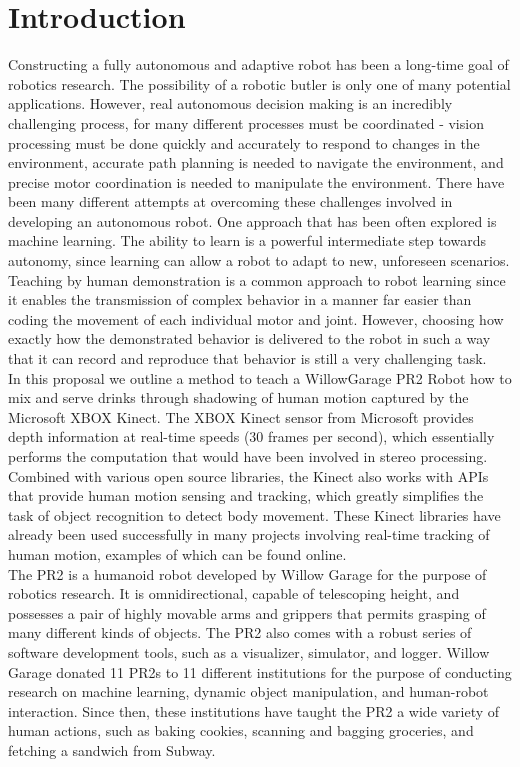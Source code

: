 \documentclass{sig-alternate}
\begin{document}
\section{Introduction}
\label{sec:intro}
Constructing a fully autonomous and adaptive robot has been a long-time goal of robotics research. The possibility of a robotic butler is only one of many potential applications. However, real autonomous decision making is an incredibly challenging process, for many different processes must be coordinated - vision processing must be done quickly and accurately to respond to changes in the environment, accurate path planning is needed to navigate the environment, and precise motor coordination is needed to manipulate the environment. There have been many different attempts at overcoming these challenges involved in developing an autonomous robot. One approach that has been often explored is machine learning. The ability to learn is a powerful intermediate step towards autonomy, since learning can allow a robot to adapt to new, unforeseen scenarios. Teaching by human demonstration is a common approach to robot learning since it enables the transmission of complex behavior in a manner far easier than coding the movement of each individual motor and joint. However, choosing how exactly how the demonstrated behavior is delivered to the robot in such a way that it can record and reproduce that behavior is still a very challenging task.\\ 
In this proposal we outline a method to teach a WillowGarage PR2 Robot how to mix and serve drinks through shadowing of human motion captured by the Microsoft XBOX Kinect. The XBOX Kinect sensor from Microsoft provides depth information at real-time speeds (30 frames per second), which essentially performs the computation that would have been involved in stereo processing. Combined with various open source libraries\cite{kinect}, the Kinect also works with APIs that provide human motion sensing and tracking, which greatly simplifies the task of object recognition to detect body movement. These Kinect libraries have already been used successfully in many projects involving real-time tracking of human motion, examples of which can be found online\cite{freenect}.\\
The PR2 is a humanoid robot developed by  Willow Garage\cite{pr2} for the purpose of robotics research. It is omnidirectional, capable of telescoping height, and possesses a pair of highly movable arms and grippers that permits grasping of many different kinds of objects. The PR2 also comes with a robust series of software development tools, such as a visualizer, simulator, and logger. Willow Garage donated 11 PR2s to 11 different institutions for the purpose of conducting research on machine learning, dynamic object manipulation, and human-robot interaction\cite{ros_pr2}. Since then, these institutions have taught the PR2 a wide variety of human actions, such as baking cookies\cite{cookies}, scanning and bagging groceries\cite{groceries}, and fetching a sandwich from Subway\cite{subway}.\\
\end{document}
